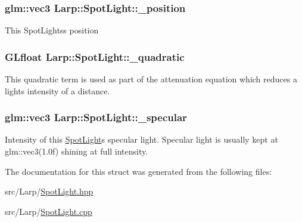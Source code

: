 \subsubsection[{\texorpdfstring{\+\_\+position}{_position}}]{\setlength{\rightskip}{0pt plus 5cm}glm\+::vec3 Larp\+::\+Spot\+Light\+::\+\_\+position}\hypertarget{structLarp_1_1SpotLight_a9b2973e9a3d0e791d2a64a47d21b4931}{}\label{structLarp_1_1SpotLight_a9b2973e9a3d0e791d2a64a47d21b4931}
This Spot\+Lights\textquotesingle{}s position 
\subsubsection[{\texorpdfstring{\+\_\+quadratic}{_quadratic}}]{\setlength{\rightskip}{0pt plus 5cm}G\+Lfloat Larp\+::\+Spot\+Light\+::\+\_\+quadratic}\hypertarget{structLarp_1_1SpotLight_aec8f8db12936663096303b1acfeac209}{}\label{structLarp_1_1SpotLight_aec8f8db12936663096303b1acfeac209}
This quadratic term is used as part of the attenuation equation which reduces a light\textquotesingle{}s intensity of a distance. 
\subsubsection[{\texorpdfstring{\+\_\+specular}{_specular}}]{\setlength{\rightskip}{0pt plus 5cm}glm\+::vec3 Larp\+::\+Spot\+Light\+::\+\_\+specular}\hypertarget{structLarp_1_1SpotLight_ac77a1e5ef1ebf9f5b71bc051e5ad87f4}{}\label{structLarp_1_1SpotLight_ac77a1e5ef1ebf9f5b71bc051e5ad87f4}
Intensity of this \hyperlink{structLarp_1_1SpotLight}{Spot\+Light}\textquotesingle{}s specular light. Specular light is usually kept at glm\+::vec3(1.\+0f) shining at full intensity. 

The documentation for this struct was generated from the following files\+:\begin{DoxyCompactItemize}
\item 
src/\+Larp/\hyperlink{SpotLight_8hpp}{Spot\+Light.\+hpp}\item 
src/\+Larp/\hyperlink{SpotLight_8cpp}{Spot\+Light.\+cpp}\end{DoxyCompactItemize}

